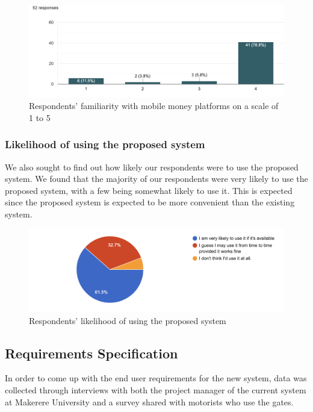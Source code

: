 \begin{figure}[h]
    \begin{center}
        \hspace{-1cm}
        \includegraphics[scale = 0.5]{images/mob-mon}
        \caption{Respondents' familiarity with mobile money platforms on a scale of 1 to 5}
    \end{center}
\end{figure}

\subsubsection{Likelihood of using the proposed system}
We also sought to find out how likely our respondents were to use the proposed system. We found that the majority of our respondents were very likely to use the proposed system, with a few being somewhat likely to use it. This is expected since the proposed system is expected to be more convenient than the existing system.

\begin{figure}[h]
    \begin{center}
        \hspace{-3.6cm}
        \includegraphics[scale = 0.6]{images/likelihood}
        \caption{Respondents' likelihood of using the proposed system}
    \end{center}
\end{figure}
\clearpage

\subsection{Requirements Specification}
In order to come up with the end user requirements for the new system, data was collected through interviews with both the project manager of the current system at Makerere University and a survey shared with motorists who use the gates.

